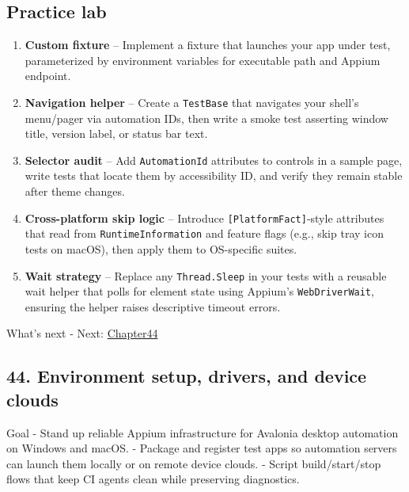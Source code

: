 \subsection{Practice lab}\label{practice-lab-10}

\begin{enumerate}
\def\labelenumi{\arabic{enumi}.}
\tightlist
\item
  \textbf{Custom fixture} -- Implement a fixture that launches your app
  under test, parameterized by environment variables for executable path
  and Appium endpoint.
\item
  \textbf{Navigation helper} -- Create a
  \passthrough{\lstinline!TestBase!} that navigates your shell's
  menu/pager via automation IDs, then write a smoke test asserting
  window title, version label, or status bar text.
\item
  \textbf{Selector audit} -- Add \passthrough{\lstinline!AutomationId!}
  attributes to controls in a sample page, write tests that locate them
  by accessibility ID, and verify they remain stable after theme
  changes.
\item
  \textbf{Cross-platform skip logic} -- Introduce
  \passthrough{\lstinline![PlatformFact]!}-style attributes that read
  from \passthrough{\lstinline!RuntimeInformation!} and feature flags
  (e.g., skip tray icon tests on macOS), then apply them to OS-specific
  suites.
\item
  \textbf{Wait strategy} -- Replace any
  \passthrough{\lstinline!Thread.Sleep!} in your tests with a reusable
  wait helper that polls for element state using Appium's
  \passthrough{\lstinline!WebDriverWait!}, ensuring the helper raises
  descriptive timeout errors.
\end{enumerate}

What's next - Next: \href{Chapter44.md}{Chapter44}

\newpage

\subsection{44. Environment setup, drivers, and device
clouds}\label{environment-setup-drivers-and-device-clouds}

Goal - Stand up reliable Appium infrastructure for Avalonia desktop
automation on Windows and macOS. - Package and register test apps so
automation servers can launch them locally or on remote device clouds. -
Script build/start/stop flows that keep CI agents clean while preserving
diagnostics.

